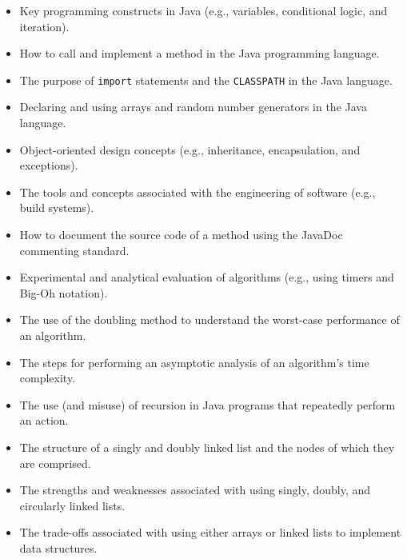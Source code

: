 \vspace*{-.05in}
\begin{itemize}

  \itemsep 0in

  \item Key programming constructs in Java (e.g., variables, conditional logic, and iteration).

  \item How to call and implement a method in the Java programming language.

  \item The purpose of {\tt import} statements and the {\tt CLASSPATH} in the Java language.

  \item Declaring and using arrays and random number generators in the Java language.

  \item Object-oriented design concepts (e.g., inheritance, encapsulation, and exceptions).

  \item The tools and concepts associated with the engineering of software (e.g., build systems).

  \item How to document the source code of a method using the JavaDoc commenting standard.

  \item Experimental and analytical evaluation of algorithms (e.g., using timers and Big-Oh notation).

  \item The use of the doubling method to understand the worst-case performance of an algorithm.

  \item The steps for performing an asymptotic analysis of an algorithm's time complexity.

  \item The use (and misuse) of recursion in Java programs that repeatedly perform an action.

  \item The structure of a singly and doubly linked list and the nodes of which they are comprised.

  \item The strengths and weaknesses associated with using singly, doubly, and circularly linked lists.

  \item The trade-offs associated with using either arrays or linked lists to implement data structures.


\end{itemize}
